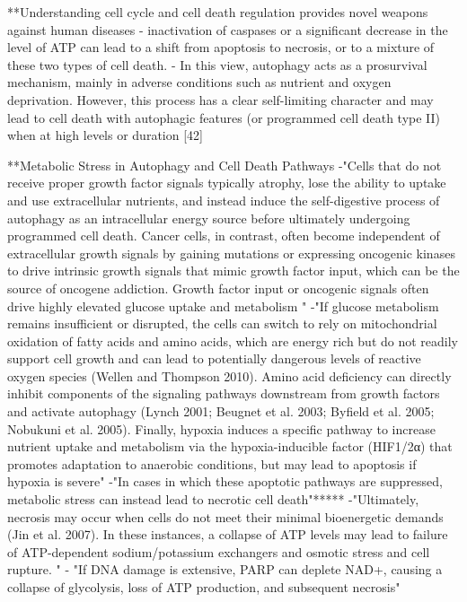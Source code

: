 \documentclass[11pt,a4paper]{article}
\begin{document}
**Understanding cell cycle and cell death regulation provides novel weapons against human diseases
- inactivation of caspases or a significant decrease in the level of ATP can lead to a shift from apoptosis to necrosis, or to a mixture of these two types of cell death. 
- In this view, autophagy acts as a prosurvival mechanism, mainly in adverse conditions such as nutrient and oxygen deprivation. However, this process has a clear self-limiting character and may lead to cell death with autophagic features (or programmed cell death type II) when at high levels or duration [42]

**Metabolic Stress in Autophagy and Cell Death Pathways
-"Cells that do not receive proper growth factor signals typically atrophy, lose the ability to uptake and use extracellular nutrients, and instead induce the self-digestive process of autophagy as an intracellular energy source before ultimately undergoing programmed cell death. Cancer cells, in contrast, often become independent of extracellular growth signals by gaining mutations or expressing oncogenic kinases to drive intrinsic growth signals that mimic growth factor input, which can be the source of oncogene addiction. Growth factor input or oncogenic signals often drive highly elevated glucose uptake and metabolism "
-"If glucose metabolism remains insufficient or disrupted, the cells can switch to rely on mitochondrial oxidation of fatty acids and amino acids, which are energy rich but do not readily support cell growth and can lead to potentially dangerous levels of reactive oxygen species (Wellen and Thompson 2010). Amino acid deficiency can directly inhibit components of the signaling pathways downstream from growth factors and activate autophagy (Lynch 2001; Beugnet et al. 2003; Byfield et al. 2005; Nobukuni et al. 2005). Finally, hypoxia induces a specific pathway to increase nutrient uptake and metabolism via the hypoxia-inducible factor (HIF1/2α) that promotes adaptation to anaerobic conditions, but may lead to apoptosis if hypoxia is severe"
-"In cases in which these apoptotic pathways are suppressed, metabolic stress can instead lead to necrotic cell death"*****
-"Ultimately, necrosis may occur when cells do not meet their minimal bioenergetic demands (Jin et al. 2007). In these instances, a collapse of ATP levels may lead to failure of ATP-dependent sodium/potassium exchangers and osmotic stress and cell rupture. "
- "If DNA damage is extensive, PARP can deplete NAD+, causing a collapse of glycolysis, loss of ATP production, and subsequent necrosis"
\end{document}
